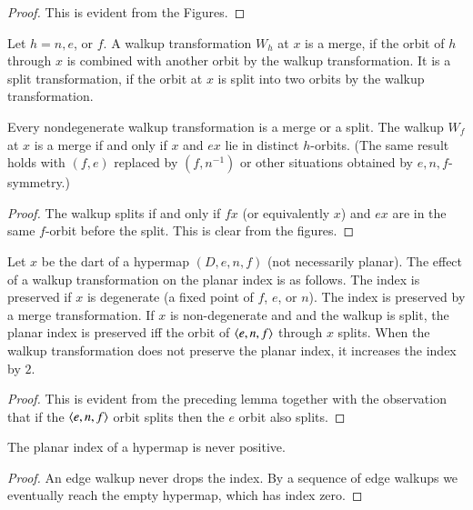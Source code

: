 \begin{proof} This is evident from the Figures.
\end{proof}

\begin{definition} Let $h=n,e$, or $f$.
A walkup transformation $W_h$ at $x$ is a merge,
if the orbit of $h$ through $x$ is combined with another orbit by
the walkup transformation.  It is a split transformation, if the
orbit at $x$ is split into two orbits by the walkup transformation.
\end{definition}

\begin{lemma} Every nondegenerate walkup transformation is a merge or a split.
The walkup $W_f$ at $x$ is a merge if and only if $x$ and $e x$  lie
in distinct $h$-orbits.  (The same result holds with $(f,e)$
replaced by $(f,n^{-1})$ or other situations obtained by
$e,n,f$-symmetry.)
\end{lemma}

\begin{proof} The walkup splits if and only if $f x$ (or equivalently $x$)
and $e x$ are in the same $f$-orbit before the split. This is clear
from the figures.
\end{proof}

\begin{lemma}  Let $x$ be the dart of a hypermap $(D,e,n,f)$ (not necessarily
planar). The effect of a walkup transformation on the planar index
is as follows.  The index is preserved if $x$ is degenerate (a fixed
point of $f$, $e$, or $n$). The index is preserved by a merge
transformation. If $x$ is non-degenerate and and the walkup is
split, the planar index is preserved iff the orbit of
$\langle e,n,f\rangle$ through $x$ splits. When the walkup transformation
does not preserve the planar index, it increases the index by $2$.
\end{lemma}

\begin{proof}  This is evident from the preceding lemma together
with the observation that if the $\langle e,n,f\rangle$ orbit splits then
the $e$ orbit also splits.
\end{proof}



\begin{lemma}  The planar index
of a hypermap is never positive.
\end{lemma}

\begin{proof}  An edge walkup never drops the index.  By a sequence
of edge walkups we eventually reach the empty hypermap, which has
index zero.
\end{proof}



